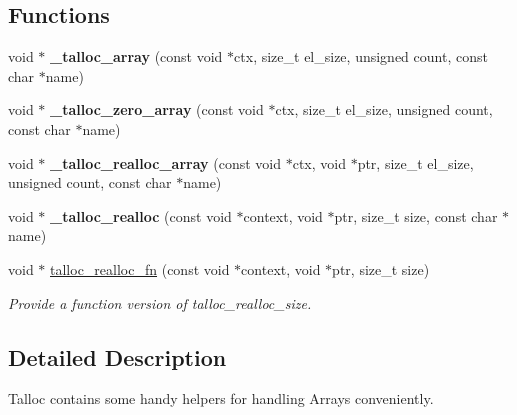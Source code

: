 \subsection*{Functions}
\begin{DoxyCompactItemize}
\item 
\hypertarget{group__talloc__array_ga99cea1d4b906880802cf2f6d9ab5f10f}{}void $\ast$ {\bfseries \+\_\+talloc\+\_\+array} (const void $\ast$ctx, size\+\_\+t el\+\_\+size, unsigned count, const char $\ast$name)\label{group__talloc__array_ga99cea1d4b906880802cf2f6d9ab5f10f}

\item 
\hypertarget{group__talloc__array_ga0e753918bcd7ce011986352f2d0aeb89}{}void $\ast$ {\bfseries \+\_\+talloc\+\_\+zero\+\_\+array} (const void $\ast$ctx, size\+\_\+t el\+\_\+size, unsigned count, const char $\ast$name)\label{group__talloc__array_ga0e753918bcd7ce011986352f2d0aeb89}

\item 
\hypertarget{group__talloc__array_ga0e9053a375fc9fd108f9e91f60faeda5}{}void $\ast$ {\bfseries \+\_\+talloc\+\_\+realloc\+\_\+array} (const void $\ast$ctx, void $\ast$ptr, size\+\_\+t el\+\_\+size, unsigned count, const char $\ast$name)\label{group__talloc__array_ga0e9053a375fc9fd108f9e91f60faeda5}

\item 
\hypertarget{group__talloc__array_ga8fa7466343f5670d70c36e7f29879ab0}{}void $\ast$ {\bfseries \+\_\+talloc\+\_\+realloc} (const void $\ast$context, void $\ast$ptr, size\+\_\+t size, const char $\ast$name)\label{group__talloc__array_ga8fa7466343f5670d70c36e7f29879ab0}

\item 
void $\ast$ \hyperlink{group__talloc__array_ga6e41faa2e58dd692511063221ae2ff7b}{talloc\+\_\+realloc\+\_\+fn} (const void $\ast$context, void $\ast$ptr, size\+\_\+t size)
\begin{DoxyCompactList}\small\item\em Provide a function version of talloc\+\_\+realloc\+\_\+size. \end{DoxyCompactList}\end{DoxyCompactItemize}


\subsection{Detailed Description}
Talloc contains some handy helpers for handling Arrays conveniently. 



